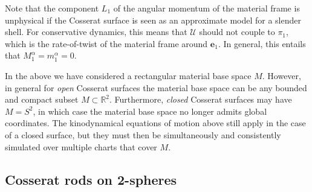 Note that the component $L_1$ of the angular momentum of the material frame is unphysical if the Cosserat surface is seen as an approximate model for a slender shell. For conservative dynamics, this means that $\mathcal{U}$ should not couple to $\pi_1$, which is the rate-of-twist of the material frame around $\mathbf{e}_1$. In general, this entails that $M^\alpha_1 = m^\alpha_1 = 0$.

In the above we have considered a rectangular material base space $M$. However, in general for \textit{open} Cosserat surfaces the material base space can be any bounded and compact subset $M \subset \mathbb{R}^2$. Furthermore, \textit{closed} Cosserat surfaces may have $M = S^2$, in which case the material base space no longer admits global coordinates. The kinodynamical equations of motion above still apply in the case of a closed surface, but they must then be simultaneously and consistently simulated over multiple charts that cover $M$.










\subsection{Cosserat rods on 2-spheres} \label{sec:Cosserat rods on 2-spheres}

